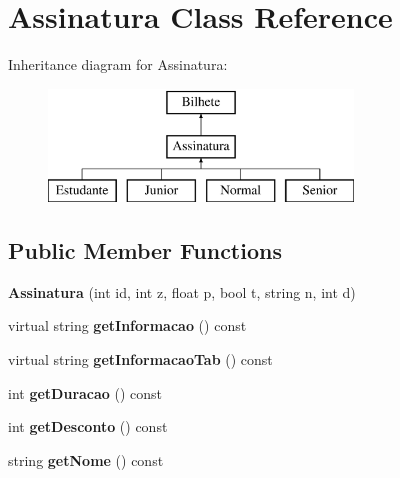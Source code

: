 \hypertarget{classAssinatura}{}\section{Assinatura Class Reference}
\label{classAssinatura}
Inheritance diagram for Assinatura\+:\begin{figure}[H]
\begin{center}
\leavevmode
\includegraphics[height=3.000000cm]{classAssinatura}
\end{center}
\end{figure}
\subsection*{Public Member Functions}
\begin{DoxyCompactItemize}
\item 
\mbox{\label{classAssinatura_a044ee090d7f3d56e5bb17cb5814edef1}} 
{\bfseries Assinatura} (int id, int z, float p, bool t, string n, int d)
\item 
\mbox{\label{classAssinatura_ab4104cd9cbcde184cda5cae1a1ec8140}} 
virtual string {\bfseries get\+Informacao} () const
\item 
\mbox{\label{classAssinatura_aad7f8ecaa9e26caf7927f163f5f593b2}} 
virtual string {\bfseries get\+Informacao\+Tab} () const
\item 
\mbox{\label{classAssinatura_a25897ccda338b996788f50553a53c415}} 
int {\bfseries get\+Duracao} () const
\item 
\mbox{\label{classAssinatura_a76b8a9aca6c01f73ec2a89fcbe3635ac}} 
int {\bfseries get\+Desconto} () const
\item 
\mbox{\label{classAssinatura_a11f5e9dc07fe4144a715b33ae1033ac4}} 
string {\bfseries get\+Nome} () const
\end{DoxyCompactItemize}
